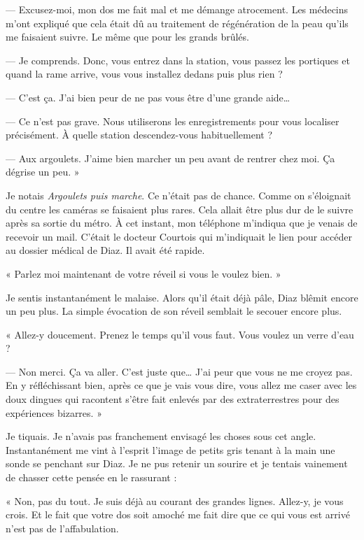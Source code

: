 — Excusez-moi, mon dos me fait mal et me démange atrocement. Les médecins m'ont expliqué que cela était dû au 
traitement de régénération de la peau qu'ils me faisaient suivre. Le même que pour les grands brûlés.

— Je comprends. Donc, vous entrez dans la station, vous passez les portiques et quand la rame arrive, vous vous 
installez dedans puis plus rien ?

— C'est ça. J'ai bien peur de ne pas vous être d'une grande aide…

— Ce n'est pas grave. Nous utiliserons les enregistrements pour vous localiser précisément. À quelle station
descendez-vous habituellement ?

— Aux argoulets. J'aime bien marcher un peu avant de rentrer chez moi. Ça dégrise un peu. »

Je notais \emph{Argoulets puis marche}. Ce n'était pas de chance. Comme on s'éloignait du centre les caméras se
faisaient plus rares. Cela allait être plus dur de le suivre après sa sortie du métro. À cet instant, mon téléphone
m'indiqua que je venais de recevoir un mail. C'était le docteur Courtois qui m'indiquait le lien pour accéder au dossier
médical de Diaz. Il avait été rapide.

« Parlez moi maintenant de votre réveil si vous le voulez bien. »


Je sentis instantanément le malaise. Alors qu'il était déjà pâle, Diaz blêmit encore un peu plus.
La simple évocation de son réveil semblait le secouer encore plus.

« Allez-y doucement. Prenez le temps qu'il vous faut. Vous voulez un verre d'eau ?

— Non merci. Ça va aller. C'est juste que… J'ai peur que vous ne me croyez pas. En y réfléchissant bien, après ce que
je vais vous dire, vous allez me caser avec les doux dingues qui racontent s'être fait enlevés par des extraterrestres
pour des expériences bizarres. »

Je tiquais. Je n'avais pas franchement envisagé les choses sous cet angle. Instantanément me vint à l'esprit l'image de
petits gris tenant à la main une sonde se penchant sur Diaz. Je ne pus retenir un sourire et je tentais vainement de
chasser cette pensée en le rassurant :

« Non, pas du tout. Je suis déjà au courant des grandes lignes. Allez-y, je vous crois. Et le fait que votre dos soit 
amoché me fait dire que ce qui vous est arrivé n'est pas de l'affabulation.

